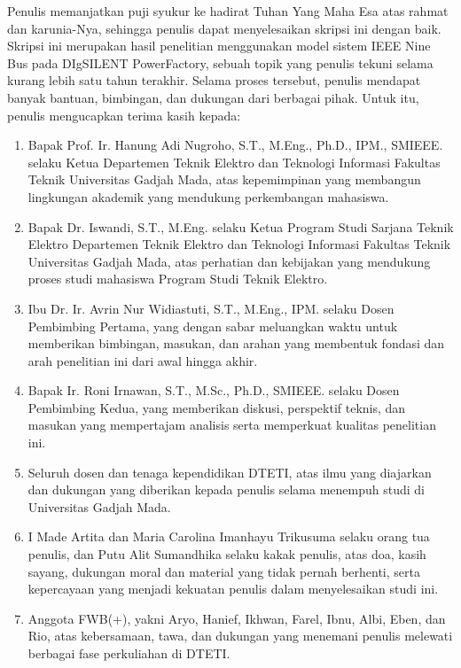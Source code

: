 Penulis memanjatkan puji syukur ke hadirat Tuhan Yang Maha Esa atas rahmat dan karunia-Nya, sehingga penulis dapat menyelesaikan skripsi ini dengan baik. Skripsi ini merupakan hasil penelitian menggunakan model sistem IEEE Nine Bus pada DIgSILENT PowerFactory, sebuah topik yang penulis tekuni selama kurang lebih satu tahun terakhir. Selama proses tersebut, penulis mendapat banyak bantuan, bimbingan, dan dukungan dari berbagai pihak. Untuk itu, penulis mengucapkan terima kasih kepada:

\begin{enumerate}
	\item Bapak Prof. Ir. Hanung Adi Nugroho, S.T., M.Eng., Ph.D., IPM., SMIEEE. selaku Ketua Departemen Teknik Elektro dan Teknologi Informasi Fakultas Teknik Universitas Gadjah Mada, atas kepemimpinan yang membangun lingkungan akademik yang mendukung perkembangan mahasiswa.

	\item Bapak Dr. Iswandi, S.T., M.Eng. selaku Ketua Program Studi Sarjana Teknik Elektro Departemen Teknik Elektro dan Teknologi Informasi Fakultas Teknik Universitas Gadjah Mada, atas perhatian dan kebijakan yang mendukung proses studi mahasiswa Program Studi Teknik Elektro.

	\item Ibu Dr. Ir. Avrin Nur Widiastuti, S.T., M.Eng., IPM. selaku Dosen Pembimbing Pertama, yang dengan sabar meluangkan waktu untuk memberikan bimbingan, masukan, dan arahan yang membentuk fondasi dan arah penelitian ini dari awal hingga akhir.

	\item Bapak Ir. Roni Irnawan, S.T., M.Sc., Ph.D., SMIEEE. selaku Dosen Pembimbing Kedua, yang memberikan diskusi, perspektif teknis, dan masukan yang mempertajam analisis serta memperkuat kualitas penelitian ini.

	\item Seluruh dosen dan tenaga kependidikan DTETI, atas ilmu yang diajarkan dan dukungan yang diberikan kepada penulis selama menempuh studi di Universitas Gadjah Mada.

	\item I Made Artita dan Maria Carolina Imanhayu Trikusuma selaku orang tua penulis, dan Putu Alit Sumandhika selaku kakak penulis, atas doa, kasih sayang, dukungan moral dan material yang tidak pernah berhenti, serta kepercayaan yang menjadi kekuatan penulis dalam menyelesaikan studi ini.

	\item Anggota FWB(+), yakni Aryo, Hanief, Ikhwan, Farel, Ibnu, Albi, Eben, dan Rio, atas kebersamaan, tawa, dan dukungan yang menemani penulis melewati berbagai fase perkuliahan di DTETI.


\end{enumerate}
